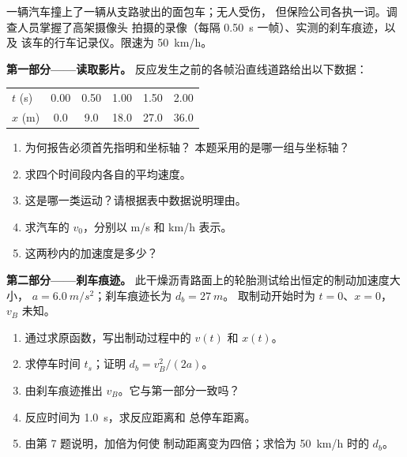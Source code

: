\begin{problem}
\label{pb:g12:kinematics-2d:1}
一辆汽车撞上了一辆从支路驶出的面包车；无人受伤，
但保险公司各执一词。调查人员掌握了高架摄像头
拍摄的录像（每隔 \qty{0.50}{s} 一帧）、实测的刹车痕迹，以及
该车的行车记录仪。限速为 \qty{50}{km/h}。

\medskip
\noindent\textbf{第一部分——读取影片。}
反应发生之前的各帧沿直线道路给出以下数据：
\begin{center}\small
\begin{tabular}{lccccc}
$t$ (\unit{s}) & 0.00 & 0.50 & 1.00 & 1.50 & 2.00\\
$x$ (\unit{m}) & 0.0 & 9.0 & 18.0 & 27.0 & 36.0
\end{tabular}
\end{center}
\begin{enumerate}
  \item 为何报告必须首先指明和坐标轴？
        本题采用的是哪一组与坐标轴？
  \item 求四个时间段内各自的平均速度。
  \item 这是哪一类运动？请根据表中数据说明理由。
  \item 求汽车的 $v_0$，分别以 \unit{m/s} 和 \unit{km/h} 表示。
  \item 这两秒内的加速度是多少？
\end{enumerate}

\medskip
\noindent\textbf{第二部分——刹车痕迹。}
此干燥沥青路面上的轮胎测试给出恒定的制动加速度大小，
$a = \qty{6.0}{m/s^2}$；刹车痕迹长为 $d_b = \qty{27}{m}$。
取制动开始时为 $t = 0$、$x = 0$， $v_B$ 未知。
\begin{enumerate}[resume]
  \item 通过求原函数，写出制动过程中的 $v(t)$ 和 $x(t)$。
  \item 求停车时间 $t_s$；证明 $d_b = v_B^2/(2a)$。
  \item 由刹车痕迹推出 $v_B$。它与第一部分一致吗？
  \item 反应时间为 \qty{1.0}{s}，求反应距离和
        总停车距离。
  \item 由第 7 题说明，加倍为何使
        制动距离变为四倍；求恰为 \qty{50}{km/h} 时的 $d_b$。
\end{enumerate}


\end{problem}
